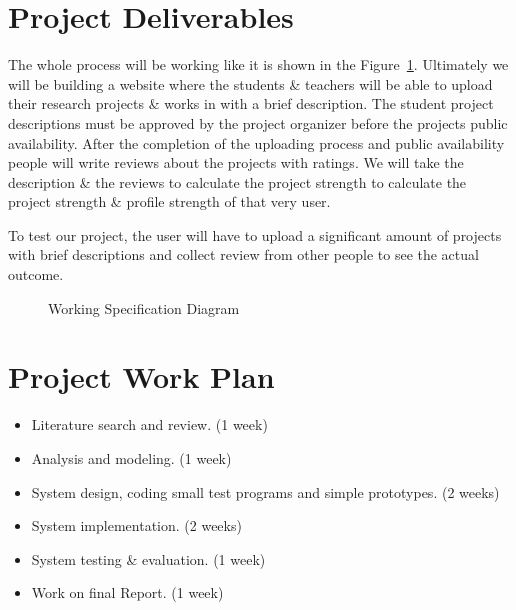\documentclass[dvips,12pt]{article}
\begin{document}
\section{Project Deliverables}


The whole process will be working like it is shown in the Figure~\ref{m42}. Ultimately we will be building a website where the students \& teachers will be able to upload their research projects \& works in with a brief description. The student project descriptions must be approved by the project organizer before the projects public availability. After the completion of the uploading process and public availability people will write reviews about the projects with ratings. We will take the description \& the reviews to calculate the project strength to calculate the project strength \& profile strength of that very user.

To test our project, the user will have to upload a significant amount of projects with brief descriptions and collect review from other people to see the actual outcome.


\begin{figure}
\begin{center}
\end{center}
\caption{Working Specification Diagram\label{m42}}

\end{figure}
\clearpage
\section{Project Work Plan}

\begin{itemize}
\item Literature search and review. (1 week)
\item Analysis and modeling. (1 week)
\item System design, coding small test programs and simple prototypes. (2 weeks)
\item System implementation. (2 weeks)
\item System testing \& evaluation. (1 week)
\item Work on final Report. (1 week)
\end{itemize}
\end{document}

